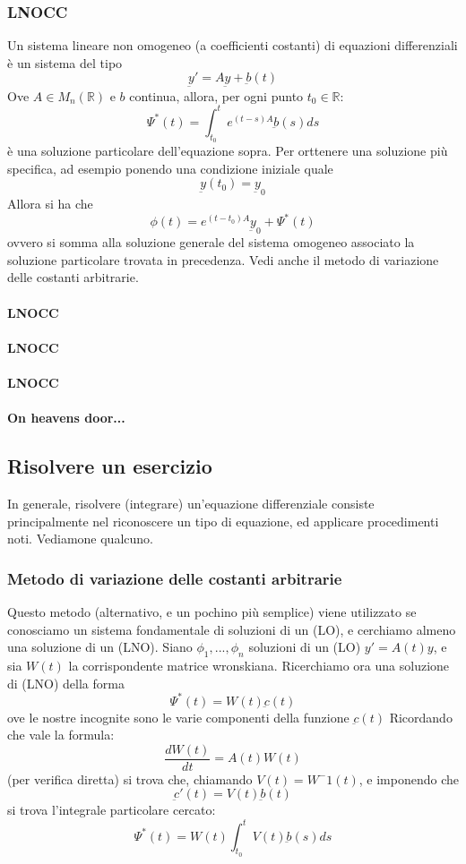 \documentclass[a4paper,12pt]{article}
\begin{document}
\subsubsection{LNOCC}
Un sistema lineare non omogeneo (a coefficienti costanti) di equazioni differenziali è un sistema del tipo
$$\underbar{y}'=A\underbar{y}+\underbar{b}(t)$$
Ove $A\in M_n(\mathbb{R})$ e $b$ continua, allora, per ogni punto $t_0 \in \mathbb{R}$:
$$\Psi^*(t)= \int_{t_0}^t e^{(t-s)A} \underbar{b}(s)ds$$
è una soluzione particolare dell'equazione sopra.
Per orttenere una soluzione più specifica, ad esempio ponendo una condizione iniziale quale
$$\underbar{y}(t_0)=\underbar{y}_0$$
Allora si ha che
$$\phi(t)=e^{(t-t_0)A}\underbar{y}_0+\Psi^*(t)$$
ovvero si somma alla soluzione generale del sistema omogeneo associato la soluzione particolare trovata in precedenza.
Vedi anche il metodo di variazione delle costanti arbitrarie.

\paragraph{LNOCC}
\paragraph{LNOCC}
\paragraph{LNOCC}
\paragraph{On heavens door...}
\subsection{Risolvere un esercizio}
In generale, risolvere (integrare) un'equazione differenziale consiste principalmente nel riconoscere un tipo di equazione, ed applicare procedimenti noti. Vediamone qualcuno.

\subsubsection{Metodo di variazione delle costanti arbitrarie}
Questo metodo (alternativo, e un pochino più semplice) viene utilizzato se conosciamo un sistema fondamentale di soluzioni di un (LO), e cerchiamo almeno una soluzione di un (LNO).
Siano $\phi_1,...,\phi_n$ soluzioni di un (LO) $y'= A(t)y$, e sia $W(t)$ la corrispondente matrice wronskiana.
Ricerchiamo ora una soluzione di (LNO) della forma
$$\Psi^*(t)=W(t)\underbar{c}(t)$$
ove le nostre incognite sono le varie componenti della funzione $\underbar{c}(t)$
Ricordando che vale la formula:
$$\frac{dW(t)}{dt} = A(t)W(t)$$
(per verifica diretta) si trova che, chiamando $V(t) = W^-1(t)$, e imponendo che $$\underbar{c}'(t) = V(t)\underbar{b}(t)$$
si trova l'integrale particolare cercato:
$$\Psi^*(t)= W(t)\int_{t_0}^t V(t)\underbar{b}(s) ds$$
\end{document}
